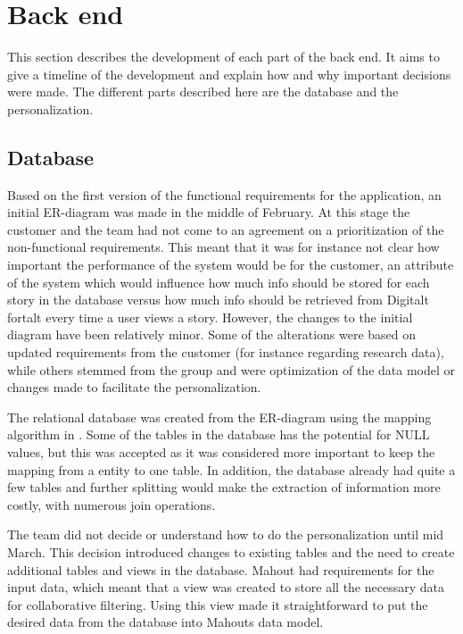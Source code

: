 \section{Back end}

This section describes the development of each part of the back end. It aims to give a timeline of the development and explain how and why important decisions were made. The different parts described here are the database and the personalization.  

\subsection{Database}

Based on the first version of the functional requirements for the application, an initial ER-diagram was made in the middle of February. At this stage the customer and the team had not come to an agreement on a prioritization of the non-functional requirements. This meant that it was for instance not clear how important the performance of the system would be for the customer, an attribute of the system which would influence how much info should be stored for each story in the database versus how much info should be retrieved from Digitalt fortalt every time a user views a story. However, the changes to the initial diagram have been relatively minor. Some of the alterations were based on updated requirements from the customer (for instance regarding research data), while others stemmed from the group and were optimization of the data model or changes made to facilitate the personalization.\newline

The relational database was created from the ER-diagram using the mapping algorithm in \cite[p.270-278]{AS2}. Some of the tables in the database has the potential for NULL values, but this was accepted as it was considered more important to keep the mapping from a entity to one table. In addition, the database already had quite a few tables and further splitting would make the extraction of information more costly, with numerous join operations. \newline 

The team did not decide or understand how to do the personalization until mid March. This decision introduced changes to existing tables and the need to create additional tables and views in the database. Mahout had requirements for the input data, which meant that a view was created to store all the necessary data for collaborative filtering. Using this view made it straightforward to put the desired data from the database into Mahouts data model.

